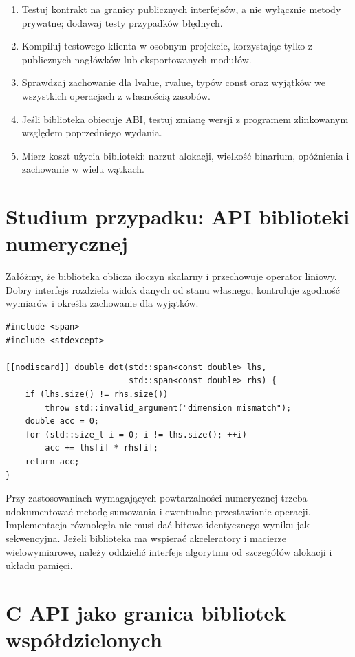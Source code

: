 \begin{enumerate}
\item Testuj kontrakt na granicy publicznych interfejsów, a nie wyłącznie
      metody prywatne; dodawaj testy przypadków błędnych.
\item Kompiluj testowego klienta w osobnym projekcie, korzystając tylko
      z publicznych nagłówków lub eksportowanych modułów.
\item Sprawdzaj zachowanie dla lvalue, rvalue, typów const oraz wyjątków
      we wszystkich operacjach z własnością zasobów.
\item Jeśli biblioteka obiecuje ABI, testuj zmianę wersji z programem
      zlinkowanym względem poprzedniego wydania.
\item Mierz koszt użycia biblioteki: narzut alokacji, wielkość binarium,
      opóźnienia i zachowanie w wielu wątkach.
\end{enumerate}

\section{Studium przypadku: API biblioteki numerycznej}

Załóżmy, że biblioteka oblicza iloczyn skalarny i przechowuje operator
liniowy. Dobry interfejs rozdziela widok danych od stanu własnego,
kontroluje zgodność wymiarów i określa zachowanie dla wyjątków.

\begin{lstlisting}[caption={Niewlasnosciowe wejscie do funkcji numerycznej (C++20).}]
#include <span>
#include <stdexcept>

[[nodiscard]] double dot(std::span<const double> lhs,
                         std::span<const double> rhs) {
    if (lhs.size() != rhs.size())
        throw std::invalid_argument("dimension mismatch");
    double acc = 0;
    for (std::size_t i = 0; i != lhs.size(); ++i)
        acc += lhs[i] * rhs[i];
    return acc;
}
\end{lstlisting}

Przy zastosowaniach wymagających powtarzalności numerycznej trzeba
udokumentować metodę sumowania i ewentualne przestawianie operacji.
Implementacja równoległa nie musi dać bitowo identycznego wyniku jak
sekwencyjna. Jeżeli biblioteka ma wspierać akceleratory i macierze
wielowymiarowe, należy oddzielić interfejs algorytmu od szczegółów
alokacji i układu pamięci.

\section{C API jako granica bibliotek współdzielonych}

